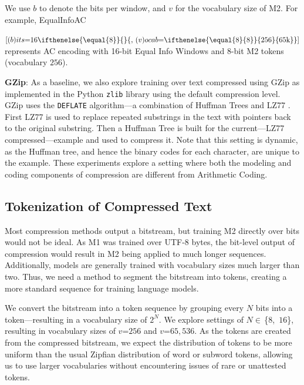 We use $b$ to denote the bits per window, and $v$ for the vocabulary size of M2\@. For example, EqualInfoAC

  {$[(b)its\mathord{=}16\ifthenelse{\equal{8}}{}{,\,(v)ocab\mathord{=}\ifthenelse{\equal{8}{8}}{256}{65\text{k}}}]$} represents AC encoding with 16-bit Equal Info Windows and 8-bit M2 tokens (vocabulary $256$).

\textbf{GZip}: As a baseline, we also explore training over text compressed using GZip \cite{rfc1952} as implemented in the Python \cite{python} \texttt{zlib} library using the default compression level. GZip uses the \texttt{DEFLATE} algorithm---a combination of Huffman Trees \cite{huffmanMethodConstructionMinimumRedundancy1952} and LZ77 \cite{zivUniversalAlgorithmSequential1977}. First LZ77 is used to replace repeated substrings in the text with pointers back to the original substring. Then a Huffman Tree is built for the current---LZ77 compressed---example and used to compress it. Note that this setting is dynamic, as the Huffman tree, and hence the binary codes for each character, are unique to the example. These experiments explore a setting where both the modeling and coding components of compression are different from Arithmetic Coding.

\subsection{Tokenization of Compressed Text}
\label{sec:bitstream-tokenization}

Most compression methods output a bitstream, but training M2 directly over bits would not be ideal. As M1 was trained over UTF-8 bytes, the bit-level output of compression would result in M2 being applied to much longer sequences. Additionally, models are generally trained with vocabulary sizes much larger than two. Thus, we need a method to segment the bitstream into tokens, creating a more standard sequence for training language models.

We convert the bitstream into a token sequence by grouping every $N$ bits into a token---resulting in a vocabulary size of $2^{N}$. We explore settings of $N\in$\,\{$8$,~$16$\}, resulting in vocabulary sizes of $v\mathord{=}256$ and $v\mathord{=}65{,}536$. As the tokens are created from the compressed bitstream, we expect the distribution of tokens to be more uniform than the usual Zipfian \cite{Zipf:1935kj} distribution of word or subword tokens, allowing us to use larger vocabularies without encountering issues of rare or unattested tokens.

